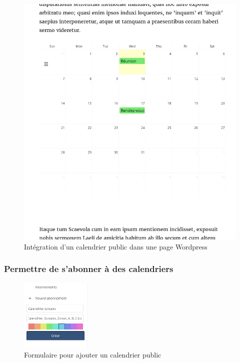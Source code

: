 \documentclass[10pt,a4paper]{report}
\begin{document}
	\begin{figure}[ht]
		\includegraphics[width=0.5\paperwidth]{images/integration_wordpress}
		\caption*{Intégration d'un calendrier public dans une page Wordpress}
		\label{normal_case}
	\end{figure}
	
	\subsubsection{Permettre de s'abonner à des calendriers}
	
	\begin{figure}[ht]
		\centering
		\includegraphics[width=0.30\textwidth]{images/creation_abonnement.png}
		\caption*{Formulaire pour ajouter un calendrier public}
		\label{normal_case}
	\end{figure}
	
\end{document}
